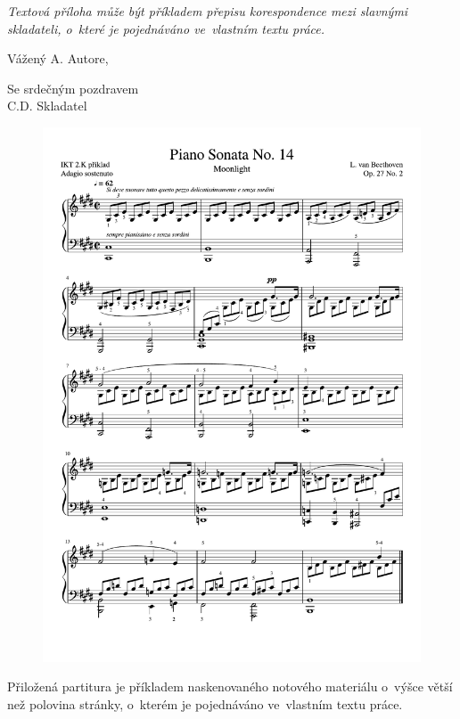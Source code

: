 \clearpage
\begin{appendices}



\textit{
Textová příloha může být příkladem přepisu korespondence mezi slavnými
skladateli, o~které je pojednáváno ve~vlastním textu práce.
}

\noindent
Vážený A. Autore,

\lipsum

\lipsum

\begin{flushright}
Se srdečným pozdravem \\
C.D. Skladatel
\end{flushright}



\begin{figure}[!ht]
	\begin{center}
		\includegraphics[width=\textwidth]{./obrazky/partitura-priklad.pdf}
    \end{center}
\end{figure}

\noindent
Přiložená partitura je příkladem naskenovaného notového materiálu o~výšce
větší než polovina stránky, o~kterém je pojednáváno ve~vlastním textu práce.


\end{appendices}
